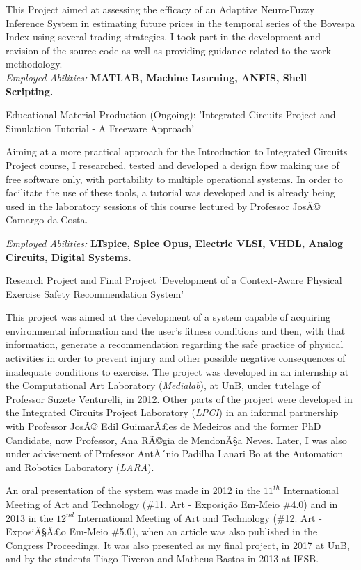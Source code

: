 \documentclass[a4paper]{twentysecondcv} %
\begin{document}
\begin{twenty}
{This Project aimed at assessing the efficacy of an Adaptive Neuro-Fuzzy Inference System in estimating future prices in the temporal series of the Bovespa Index using several trading strategies. I took part in the development and revision of the source code as well as providing guidance related to the work methodology.\\
\textit{Employed Abilities:} \textbf{MATLAB, Machine Learning, ANFIS, Shell Scripting.\\}}

\twentyitem
{Educational Material Production (Ongoing):}
{'Integrated Circuits Project and Simulation Tutorial - A Freeware Approach'}
{}
{\hspace{8pt} Aiming at a more practical approach for the Introduction to Integrated Circuits Project course, I researched, tested and developed a design flow making use of free software only, with portability to multiple operational systems. In order to facilitate the use of these tools, a tutorial was developed and is already being used in the laboratory sessions of this course lectured by Professor JosÃ© Camargo da Costa.

\hspace{8pt}\textit{Employed Abilities:} \textbf{LTspice, Spice Opus, Electric VLSI, VHDL, Analog Circuits, Digital Systems.\\}}

\twentyitem
{Research Project and Final Project}
{'Development of a Context-Aware Physical Exercise Safety Recommendation System'}
{}
{\hspace{8pt}This project was aimed at the development of a system capable of acquiring environmental information and the user's fitness conditions and then, with that information, generate a recommendation regarding the safe practice of physical activities in order to prevent injury and other possible negative consequences of inadequate conditions to exercise. The project was developed in an internship at the Computational Art Laboratory (\textit{Medialab}), at UnB, under tutelage of Professor Suzete Venturelli, in 2012. Other parts of the project were developed in the Integrated Circuits Project Laboratory (\textit{LPCI}) in an informal partnership with Professor JosÃ© Edil GuimarÃ£es de Medeiros and the former PhD Candidate, now Professor, Ana RÃ©gia de MendonÃ§a Neves. Later, I was also under advisement of Professor AntÃ´nio Padilha Lanari Bo at the Automation and Robotics Laboratory (\textit{LARA}).

\hspace{8pt}An oral presentation of the system was made in 2012 in the $11^{th}$ International Meeting of Art and Technology (\#11. Art - Exposição Em-Meio \#4.0) and in 2013 in the $12^{nd}$ International Meeting of Art and Technology (\#12. Art - ExposiÃ§Ã£o Em-Meio \#5.0), when an article was also published in the Congress Proceedings. It was also presented as my final project, in 2017 at UnB, and by the students Tiago Tiveron and Matheus Bastos in 2013 at IESB.

}
\end{twenty}
\end{document}
